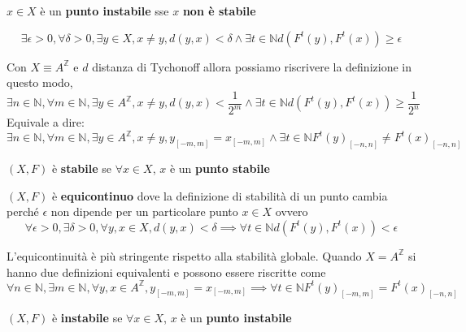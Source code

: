 \begin{definizione} 
    $x\in X$ è un \textbf{punto instabile} sse $x$ \textbf{non è stabile}

    $$\exists \epsilon > 0,\forall \delta > 0, \exists y\in X,x \ne y, d(y,x) < \delta \land \exists t\in \mathbb{N} d(F^t(y),F^t(x))\ge \epsilon$$

    Con $X \equiv A^\mathbb{Z}$ e $d$ distanza di Tychonoff allora possiamo riscrivere
    la definizione in questo modo,
    $$\exists n\in \mathbb{N} ,\forall m\in \mathbb{N} , \exists y\in A^\mathbb{Z},x \ne y, d(y,x) < \frac{1}{2^m} \land \exists t\in \mathbb{N} d(F^t(y),F^t(x))\ge \frac{1}{2^n}$$
    Equivale a dire:
    $$\exists n\in \mathbb{N} ,\forall m\in \mathbb{N} , \exists y\in A^\mathbb{Z},x \ne y, y_{[-m,m]} = x_{[-m,m]} \land \exists t\in \mathbb{N} F^t(y)_{[-n,n]}\ne F^t(x)_{[-n,n]}$$

\end{definizione}

\begin{definizione} 
    $(X,F)$ è \textbf{stabile} se $\forall x \in X$, $x$ è un \textbf{punto stabile}
\end{definizione}

\begin{definizione} 
    $(X,F)$ è \textbf{equicontinuo} dove la definizione di stabilità di un punto cambia
    perché $\epsilon$ non dipende per un particolare punto $x\in X$ ovvero
    $$\forall \epsilon > 0,\exists \delta > 0, \forall y, x\in X, d(y,x) < \delta \implies \forall t\in \mathbb{N} d(F^t(y),F^t(x))< \epsilon$$
\end{definizione}

\begin{nota}
    L'equicontinuità è più stringente rispetto alla stabilità globale. Quando $X=A^\mathbb{Z}$
    si hanno due definizioni equivalenti e possono essere riscritte come
    $$\forall n\in \mathbb{N} ,\exists m\in \mathbb{N} , \forall y,x\in A^\mathbb{Z}, y_{[-m,m]} = x_{[-m,m]} \implies \forall t\in \mathbb{N} F^t(y)_{[-m,m]}=F^t(x)_{[-n,n]}$$
\end{nota}
\begin{definizione} 
    $(X,F)$ è \textbf{instabile} se $\forall x \in X$, $x$ è un \textbf{punto instabile}
\end{definizione}

